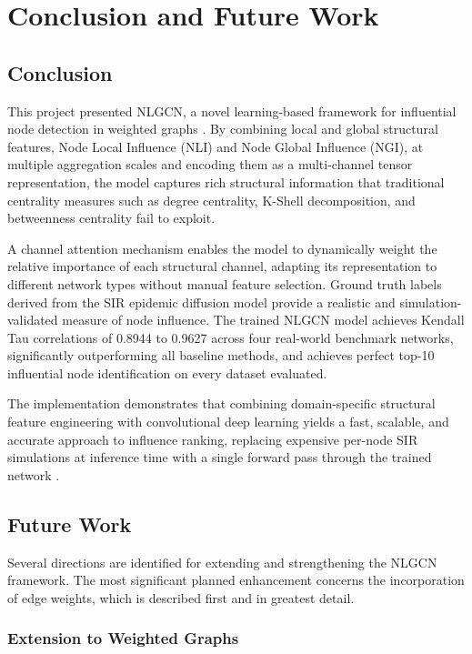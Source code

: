 \chapter{Conclusion and Future Work}

\section{Conclusion}

This project presented NLGCN, a novel learning-based framework for
influential node detection in weighted graphs \cite{guo2026}. By
combining local and global structural features, Node Local Influence
(NLI) and Node Global Influence (NGI), at multiple aggregation
scales and encoding them as a multi-channel tensor representation,
the model captures rich structural information that traditional
centrality measures such as degree centrality,
K-Shell decomposition, and betweenness centrality
 fail to exploit.

A channel attention mechanism enables the model
to dynamically weight the relative importance of each structural
channel, adapting its representation to different network types
without manual feature selection. Ground truth labels derived from
the SIR epidemic diffusion model provide a
realistic and simulation-validated measure of node influence. The
trained NLGCN model achieves Kendall Tau correlations of 0.8944 to
0.9627 across four real-world benchmark networks, significantly
outperforming all baseline methods, and
achieves perfect top-10 influential node identification on every
dataset evaluated.

The implementation demonstrates that combining domain-specific
structural feature engineering with convolutional deep learning
\cite{zhang2019gcn} yields a fast, scalable, and accurate
approach to influence ranking, replacing expensive per-node SIR
simulations at inference time with a single forward pass through
the trained network \cite{guo2026, patel2025}.

\section{Future Work}

Several directions are identified for extending and strengthening
the NLGCN framework. The most significant planned enhancement
concerns the incorporation of edge weights, which is described
first and in greatest detail.

\subsection{Extension to Weighted Graphs}

